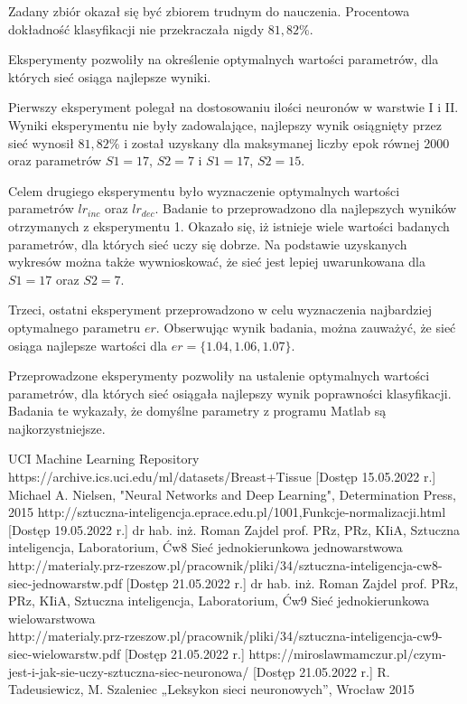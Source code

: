 \documentclass[12pt,twoside]{article}
\begin{document}
Zadany zbiór okazał się być zbiorem trudnym do nauczenia. Procentowa dokładność klasyfikacji nie przekraczała nigdy $81,82\%$. 

Eksperymenty pozwoliły na określenie optymalnych wartości parametrów, dla których sieć osiąga najlepsze wyniki. 

Pierwszy eksperyment polegał na dostosowaniu ilości neuronów w warstwie I i II. Wyniki eksperymentu nie były zadowalające, najlepszy wynik osiągnięty przez sieć wynosił $81,82\%$ i został uzyskany dla maksymanej liczby epok równej 2000 oraz parametrów $S1=17$, $S2=7$ i $S1=17$, $S2=15$. 

Celem drugiego eksperymentu było wyznaczenie optymalnych wartości parametrów $lr_{inc}$ oraz $lr_{dec}$. Badanie to przeprowadzono dla najlepszych wyników otrzymanych z eksperymentu 1. Okazało się, iż istnieje wiele wartości badanych parametrów, dla których sieć uczy się dobrze. Na podstawie uzyskanych wykresów można także wywnioskować, że sieć jest lepiej uwarunkowana dla $S1 = 17$ oraz $S2 = 7$.

Trzeci, ostatni eksperyment przeprowadzono w celu wyznaczenia najbardziej optymalnego parametru $er$. Obserwując wynik badania, można zauważyć, że sieć osiąga najlepsze wartości dla $er = \{1.04, 1.06, 1.07\}$. 

Przeprowadzone eksperymenty pozwoliły na ustalenie optymalnych wartości parametrów, dla których sieć osiągała najlepszy wynik poprawności klasyfikacji. Badania te wykazały, że domyślne parametry z programu Matlab są najkorzystniejsze. 

\clearpage



\begin{thebibliography}{4}
 UCI Machine Learning Repository\\https://archive.ics.uci.edu/ml/datasets/Breast+Tissue [Dostęp 15.05.2022 r.]
 Michael A. Nielsen, "Neural Networks and Deep Learning", Determination Press, 2015
 http://sztuczna-inteligencja.eprace.edu.pl/1001,Funkcje-normalizacji.html [Dostęp 19.05.2022 r.]
dr hab. inż. Roman Zajdel prof. PRz, PRz, KIiA, Sztuczna inteligencja, Laboratorium, Ćw8 Sieć jednokierunkowa jednowarstwowa\\
http://materialy.prz-rzeszow.pl/pracownik/pliki/34/sztuczna-inteligencja-cw8-siec-jednowarstw.pdf [Dostęp 21.05.2022 r.]
dr hab. inż. Roman Zajdel prof. PRz, PRz, KIiA, Sztuczna inteligencja, Laboratorium, Ćw9 Sieć jednokierunkowa wielowarstwowa\\
http://materialy.prz-rzeszow.pl/pracownik/pliki/34/sztuczna-inteligencja-cw9-siec-wielowarstw.pdf [Dostęp 21.05.2022 r.]
https://miroslawmamczur.pl/czym-jest-i-jak-sie-uczy-sztuczna-siec-neuronowa/ [Dostęp 21.05.2022 r.]
 R. Tadeusiewicz, M. Szaleniec „Leksykon sieci neuronowych”, Wrocław 2015


\end{thebibliography}

\clearpage
\end{document}
